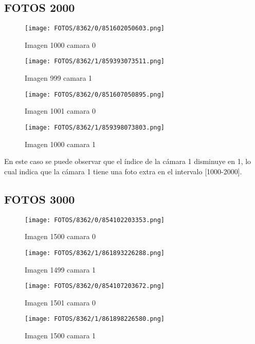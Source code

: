 \documentclass{article}
\begin{document}
\subsection{FOTOS 2000}

\begin{figure}[H]
  \centering
  \begin{minipage}[b]{0.45\textwidth}
    \centering
    \texttt{[image: FOTOS/8362/0/851602050603.png]}
    \caption{Imagen 1000 camara 0}
  \end{minipage}
  \begin{minipage}[b]{0.45\textwidth}
    \centering
    \texttt{[image: FOTOS/8362/1/859393073511.png]}
    \caption{Imagen 999 camara 1}
  \end{minipage}
  \begin{minipage}[b]{0.45\textwidth}
    \centering
    \texttt{[image: FOTOS/8362/0/851607050895.png]}
    \caption{Imagen 1001 camara 0}
  \end{minipage}
  \begin{minipage}[b]{0.45\textwidth}
    \centering
    \texttt{[image: FOTOS/8362/1/859398073803.png]}
    \caption{Imagen 1000 camara 1}
  \end{minipage}
\end{figure}

\noindent En este caso se puede observar que el índice de la cámara 1 disminuye en 1, lo cual indica que la cámara 1 tiene una foto extra en el intervalo [1000-2000].

\subsection{FOTOS 3000}

\begin{figure}[H]
  \centering
  \begin{minipage}[b]{0.45\textwidth}
    \centering
    \texttt{[image: FOTOS/8362/0/854102203353.png]}
    \caption{Imagen 1500 camara 0}
  \end{minipage}
  \begin{minipage}[b]{0.45\textwidth}
    \centering
    \texttt{[image: FOTOS/8362/1/861893226288.png]}
    \caption{Imagen 1499 camara 1}
  \end{minipage}
  \begin{minipage}[b]{0.45\textwidth}
    \centering
    \texttt{[image: FOTOS/8362/0/854107203672.png]}
    \caption{Imagen 1501 camara 0}
  \end{minipage}
  \begin{minipage}[b]{0.45\textwidth}
    \centering
    \texttt{[image: FOTOS/8362/1/861898226580.png]}
    \caption{Imagen 1500 camara 1}
  \end{minipage}
\end{figure}
\end{document}
